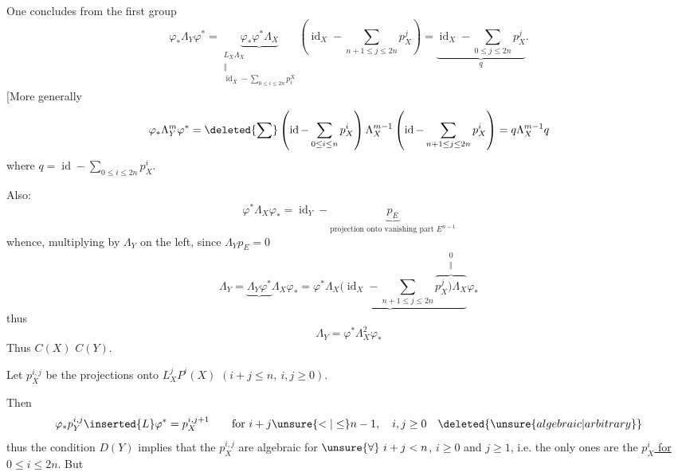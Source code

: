 One concludes from the first group
\[
\varphi_*\Lambda_Y\varphi^*
=\underbrace{\varphi_*\varphi^*\Lambda_X}_{\substack{L_X\Lambda_X\\\Vert\\\operatorname{id}_X-\sum_{0\leq i\leq2n}p_i^X}}
\left(\operatorname{id}_X-\sum_{n+1\leq j\leq2n}p_X^j\right)
=\underbrace{\operatorname{id}_X-\sum_{0\leq j\leq2n}p_X^j}_{q}.
\]
[More generally
\[
\varphi_*\Lambda_Y^m\varphi^*
=\deleted{\sum}\left(\operatorname{id}-\sum_{0\leq i\leq n}p_X^i\right)\Lambda_X^{m-1}
\left(\operatorname{id}-\sum_{n+1\leq j\leq2n}p_X^i\right)
=q\Lambda_X^{m-1}q
\]
where $q=\operatorname{id}-\displaystyle\sum_{0\leq i\leq2n}p_X^i$.

Also:
\[
\varphi^*\Lambda_X\varphi_*=\operatorname{id}_Y-\underbrace{p_E}_{\text{projection onto vanishing part }E^{n-1}}
\]
whence, multiplying by $\Lambda_Y$ on the left, since $\Lambda_Yp_E=0$
\[
\Lambda_Y=\underbrace{\Lambda_Y\varphi^*}\Lambda_X\varphi_*
=\underbrace{\varphi^*\Lambda_X(\operatorname{id}_X-\sum_{n+1\leq j\leq2n}\overbrace{p_X^j)\Lambda_X}^{\substack{0\\\Vert}}}\varphi_*
\]
thus
\[\boxed{\Lambda_Y=\varphi^*\Lambda_X^2\varphi_*}\]
Thus $C(X)$  $C(Y)$.

Let $p_X^{i,j}$ be the projections onto $L_X^jP^i(X)$ $(i+j\leq n,\ i,j\geq0)$.

Then
\[
\varphi_*p_Y^{i,j}\inserted{L}\varphi^*=p_X^{i,j+1}
\qquad\text{for }i+j\unsure{<|\leq}n-1,\quad i,j\geq0\quad\deleted{\unsure{algebraic|arbitrary}}
\]
thus the condition $D(Y)$ implies that the $p_X^{i,j}$ are algebraic for $\unsure{\forall}\ i+j<n$, $i\geq0$ and \uline{$j\geq1$}, i.e. the only ones  are the \uline{$p_X^i$ for $0\leq i\leq2n$}. But
